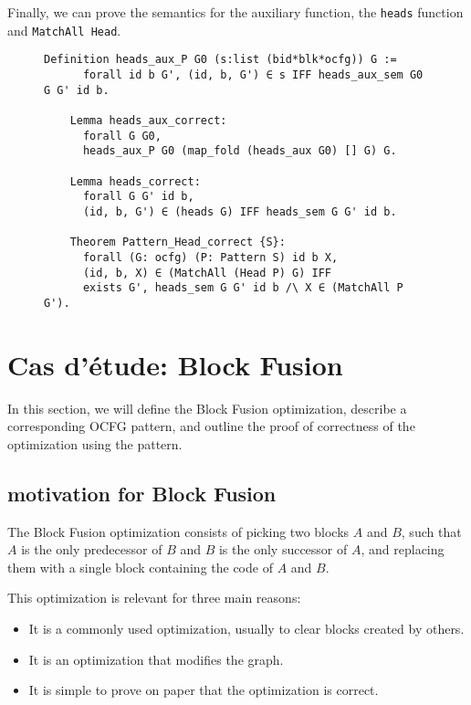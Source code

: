 \documentclass[11pt]{article}
\newcommand{\inlinecoq}[1]{\mbox{\lstinline[style=customcoq,columns=fixed,basewidth=.48em]{#1}}}
\newcommand{\ilc}[1]{\inlinecoq{#1}}
\begin{document}
Finally, we can prove the semantics for the auxiliary function, the \ilc{heads} function and \ilc{MatchAll Head}.

\begin{figure}[H]
  \label{fig:block_cor}
  \begin{lstlisting}[style=customcoq,basicstyle=\small\ttfamily]
    Definition heads_aux_P G0 (s:list (bid*blk*ocfg)) G :=
      forall id b G', (id, b, G') ∈ s IFF heads_aux_sem G0 G G' id b.

    Lemma heads_aux_correct:
      forall G G0,
      heads_aux_P G0 (map_fold (heads_aux G0) [] G) G.

    Lemma heads_correct:
      forall G G' id b,
      (id, b, G') ∈ (heads G) IFF heads_sem G G' id b.

    Theorem Pattern_Head_correct {S}:
      forall (G: ocfg) (P: Pattern S) id b X,
      (id, b, X) ∈ (MatchAll (Head P) G) IFF
      exists G', heads_sem G G' id b /\ X ∈ (MatchAll P G').
  \end{lstlisting}
\end{figure}

\section{Cas d'étude: Block Fusion}
\label{sec:case}

In this section, we will define the Block Fusion optimization, describe a corresponding OCFG pattern,
and outline the proof of correctness of the optimization using the pattern.

\subsection{motivation for Block Fusion}

The Block Fusion optimization consists of picking two blocks $A$ and $B$,
such that $A$ is the only predecessor of $B$ and $B$ is the only successor of $A$,
and replacing them with a single block containing the code of $A$ and $B$.

This optimization is relevant for three main reasons:\begin{itemize}
  \item It is a commonly used optimization, usually to clear blocks created by others.
  \item It is an optimization that modifies the graph.
  \item It is simple to prove on paper that the optimization is correct.
\end{itemize}
\end{document}
